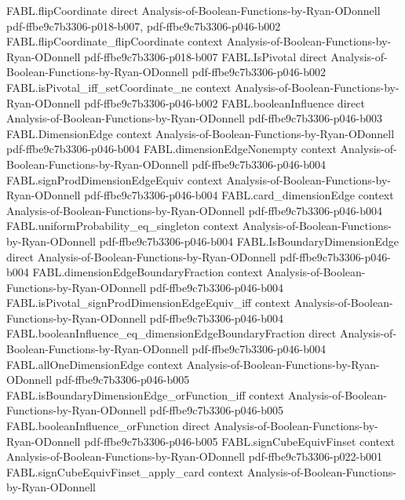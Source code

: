 \begin{theorem}
  {FABL.flipCoordinate}
  {direct}
  {Analysis-of-Boolean-Functions-by-Ryan-ODonnell}
  {pdf-ffbe9c7b3306-p018-b007,
    pdf-ffbe9c7b3306-p046-b002}
\proofstep
  {FABL.flipCoordinate_flipCoordinate}
  {context}
  {Analysis-of-Boolean-Functions-by-Ryan-ODonnell}
  {pdf-ffbe9c7b3306-p018-b007}
\proofstep
  {FABL.IsPivotal}
  {direct}
  {Analysis-of-Boolean-Functions-by-Ryan-ODonnell}
  {pdf-ffbe9c7b3306-p046-b002}
\proofstep
  {FABL.isPivotal_iff_setCoordinate_ne}
  {context}
  {Analysis-of-Boolean-Functions-by-Ryan-ODonnell}
  {pdf-ffbe9c7b3306-p046-b002}
\proofstep
  {FABL.booleanInfluence}
  {direct}
  {Analysis-of-Boolean-Functions-by-Ryan-ODonnell}
  {pdf-ffbe9c7b3306-p046-b003}
\proofstep
  {FABL.DimensionEdge}
  {context}
  {Analysis-of-Boolean-Functions-by-Ryan-ODonnell}
  {pdf-ffbe9c7b3306-p046-b004}
\proofstep
  {FABL.dimensionEdgeNonempty}
  {context}
  {Analysis-of-Boolean-Functions-by-Ryan-ODonnell}
  {pdf-ffbe9c7b3306-p046-b004}
\proofstep
  {FABL.signProdDimensionEdgeEquiv}
  {context}
  {Analysis-of-Boolean-Functions-by-Ryan-ODonnell}
  {pdf-ffbe9c7b3306-p046-b004}
\proofstep
  {FABL.card_dimensionEdge}
  {context}
  {Analysis-of-Boolean-Functions-by-Ryan-ODonnell}
  {pdf-ffbe9c7b3306-p046-b004}
\proofstep
  {FABL.uniformProbability_eq_singleton}
  {context}
  {Analysis-of-Boolean-Functions-by-Ryan-ODonnell}
  {pdf-ffbe9c7b3306-p046-b004}
\proofstep
  {FABL.IsBoundaryDimensionEdge}
  {direct}
  {Analysis-of-Boolean-Functions-by-Ryan-ODonnell}
  {pdf-ffbe9c7b3306-p046-b004}
\proofstep
  {FABL.dimensionEdgeBoundaryFraction}
  {context}
  {Analysis-of-Boolean-Functions-by-Ryan-ODonnell}
  {pdf-ffbe9c7b3306-p046-b004}
\proofstep
  {FABL.isPivotal_signProdDimensionEdgeEquiv_iff}
  {context}
  {Analysis-of-Boolean-Functions-by-Ryan-ODonnell}
  {pdf-ffbe9c7b3306-p046-b004}
\proofstep
  {FABL.booleanInfluence_eq_dimensionEdgeBoundaryFraction}
  {direct}
  {Analysis-of-Boolean-Functions-by-Ryan-ODonnell}
  {pdf-ffbe9c7b3306-p046-b004}
\proofstep
  {FABL.allOneDimensionEdge}
  {context}
  {Analysis-of-Boolean-Functions-by-Ryan-ODonnell}
  {pdf-ffbe9c7b3306-p046-b005}
\proofstep
  {FABL.isBoundaryDimensionEdge_orFunction_iff}
  {context}
  {Analysis-of-Boolean-Functions-by-Ryan-ODonnell}
  {pdf-ffbe9c7b3306-p046-b005}
\proofstep
  {FABL.booleanInfluence_orFunction}
  {direct}
  {Analysis-of-Boolean-Functions-by-Ryan-ODonnell}
  {pdf-ffbe9c7b3306-p046-b005}
\proofstep
  {FABL.signCubeEquivFinset}
  {context}
  {Analysis-of-Boolean-Functions-by-Ryan-ODonnell}
  {pdf-ffbe9c7b3306-p022-b001}
\proofstep
  {FABL.signCubeEquivFinset_apply_card}
  {context}
  {Analysis-of-Boolean-Functions-by-Ryan-ODonnell}

\end{theorem}
